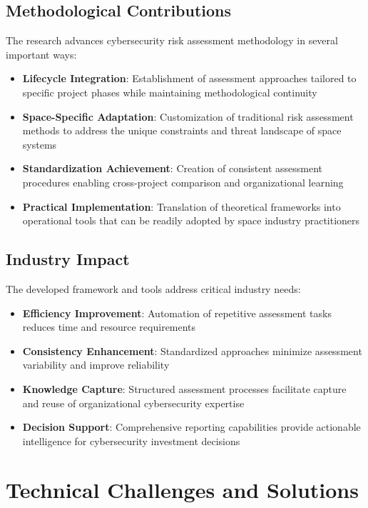 \documentclass[binding=0.6cm]{sapthesis}
\begin{document}
\subsection{Methodological Contributions}

The research advances cybersecurity risk assessment methodology in several important ways:

\begin{itemize}
    \item \textbf{Lifecycle Integration}: Establishment of assessment approaches tailored to specific project phases while maintaining methodological continuity
    \item \textbf{Space-Specific Adaptation}: Customization of traditional risk assessment methods to address the unique constraints and threat landscape of space systems
    \item \textbf{Standardization Achievement}: Creation of consistent assessment procedures enabling cross-project comparison and organizational learning
    \item \textbf{Practical Implementation}: Translation of theoretical frameworks into operational tools that can be readily adopted by space industry practitioners
\end{itemize}

\subsection{Industry Impact}

The developed framework and tools address critical industry needs:

\begin{itemize}
    \item \textbf{Efficiency Improvement}: Automation of repetitive assessment tasks reduces time and resource requirements
    \item \textbf{Consistency Enhancement}: Standardized approaches minimize assessment variability and improve reliability
    \item \textbf{Knowledge Capture}: Structured assessment processes facilitate capture and reuse of organizational cybersecurity expertise
    \item \textbf{Decision Support}: Comprehensive reporting capabilities provide actionable intelligence for cybersecurity investment decisions
\end{itemize}

\section{Technical Challenges and Solutions}
\end{document}
